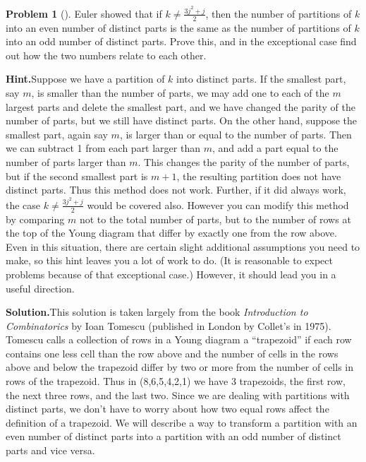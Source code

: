 \documentclass[10pt,]{book}
\theoremstyle{plain}
\theoremstyle{definition}
\newtheorem{activity}[project]{Problem}
\theoremstyle{definition}
\numberwithin{equation}{chapter}
\begin{document}
\begin{activity}[]\label{activity-177}
Euler showed that if \(k\not= \frac{3j^2+j}{2}\), then the number of partitions of \(k\) into an even number of distinct parts is the same as the number of partitions of \(k\) into an odd number of distinct parts. Prove this, and in the exceptional case find out how the two numbers relate to each other.%
\par\medskip\noindent%
\textbf{Hint.}\quad Suppose we have a partition of \(k\) into distinct parts. If the smallest part, say \(m\), is smaller than the number of parts, we may add one to each of the \(m\) largest parts and delete the smallest part, and we have changed the parity of the number of parts, but we still have distinct parts. On the other hand, suppose the smallest part, again say \(m\), is larger than or equal to the number of parts. Then we can subtract 1 from each part larger than \(m\), and add a part equal to the number of parts larger than \(m\). This changes the parity of the number of parts, but if the second smallest part is \(m+1\), the resulting partition does not have distinct parts. Thus this method does not work. Further, if it did always work, the case \(k \ne \frac{3j^2+j}{2}\) would be covered also. However you can modify this method by comparing \(m\) not to the total number of parts, but to the number of rows at the top of the Young diagram that differ by exactly one from the row above. Even in this situation, there are certain slight additional assumptions you need to make, so this hint leaves you a lot of work to do. (It is reasonable to expect problems because of that exceptional case.) However, it should lead you in a useful direction.%
\par\medskip\noindent%
\textbf{Solution.}\quad This solution is taken largely from the book \textsl{Introduction to Combinatorics} by Ioan Tomescu (published in London by Collet's in 1975). Tomescu calls a collection of rows in a Young diagram a ``trapezoid'' if each row contains one less cell than the row above and the number of cells in the rows above and below the trapezoid differ by two or more from the number of cells in rows of the trapezoid. Thus in (8,6,5,4,2,1) we have 3 trapezoids, the first row, the next three rows, and the last two. Since we are dealing with partitions with distinct parts, we don't have to worry about how two equal rows affect the definition of a trapezoid. We will describe a way to transform a partition with an even number of distinct parts into a partition with an odd number of distinct parts and vice versa.%

\end{activity}
\end{document}
